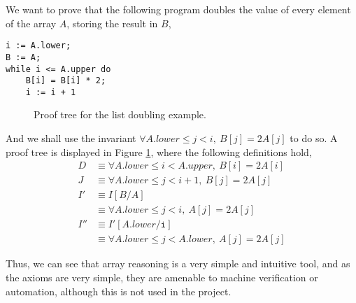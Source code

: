 \begin{example}
  \label{exmpl:heap-double}

  We want to prove that the following program doubles the value of
  every element of the array $A$, storing the result in $B$,
\pagebreak
\begin{lstlisting}
i := A.lower;
B := A;
while i <= A.upper do
    B[i] = B[i] * 2;
    i := i + 1
\end{lstlisting}

  \begin{figure}[t]
    \centering
    \begin{prooftree}




    \end{prooftree}
    \caption{Proof tree for the list doubling example.}
    \label{fig:exmpl:heap-double-tree}
  \end{figure}

  And we shall use the invariant $\forall A.lower \leq j < i,\ B[j]
  = 2 A[j]$ to do so. A proof tree is displayed in Figure
  \ref{fig:exmpl:heap-double-tree}, where the following definitions hold,
  \begin{align*}
    D &\equiv \forall A.lower \leq i < A.upper,\ B[i] = 2 A[i]\\
    J &\equiv \forall A.lower \leq j < i + 1,\ B[j] = 2 A[j]\\
    I' &\equiv I[B/A]\\
    &\equiv \forall A.lower \leq j < i,\ A[j] = 2 A[j]\\
    I'' &\equiv I'[A.lower/\mathtt{i}]\\
    &\equiv \forall A.lower \leq j < A.lower,\ A[j] = 2 A[j]
  \end{align*}
\end{example}

Thus, we can see that array reasoning is a very simple and intuitive
tool, and as the axioms are very simple, they are amenable to machine
verification or automation, although this is not used in the project.

